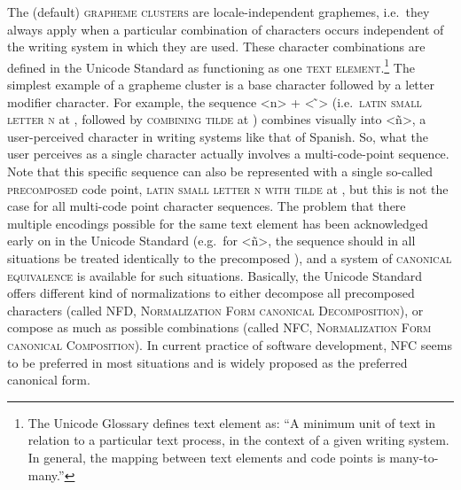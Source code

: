 The (default) \textsc{grapheme clusters} are locale-independent graphemes,
i.e.~they always apply when a particular combination of characters occurs
independent of the writing system in which they are used. These character
combinations are defined in the Unicode Standard as functioning as one
\textsc{text element}.\footnote{The Unicode Glossary defines text element as:
``A minimum unit of text in relation to a particular text process, in the
context of a given writing system. In general, the mapping between text elements
and code points is many-to-many.''} The simplest example of a grapheme cluster
is a base character followed by a letter modifier character. For example, the
sequence <n> + < ̃> (i.e.~\textsc{latin small letter n} at , followed
by \textsc{combining tilde} at ) combines visually into <ñ>, a
user-perceived character in writing systems like that of Spanish. So, what the
user perceives as a single character actually involves a multi-code-point
sequence. Note that this specific sequence can also be represented with a single
so-called \textsc{precomposed} code point, \textsc{latin small letter n with
tilde} at , but this is not the case for all multi-code point
character sequences. The problem that there multiple encodings possible for the
same text element has been acknowledged early on in the Unicode Standard
(e.g.~for <ñ>, the sequence   should in all situations be
treated identically to the precomposed ), and a system of
\textsc{canonical equivalence} is available for such situations. Basically, the
Unicode Standard offers different kind of normalizations to either decompose all
precomposed characters (called \textsc{NFD}, \textsc{Normalization Form
canonical Decomposition}), or compose as much as possible combinations (called
\textsc{NFC}, \textsc{Normalization Form canonical Composition}). In current
practice of software development, NFC seems to be preferred in most situations
and is widely proposed as the preferred canonical form.


